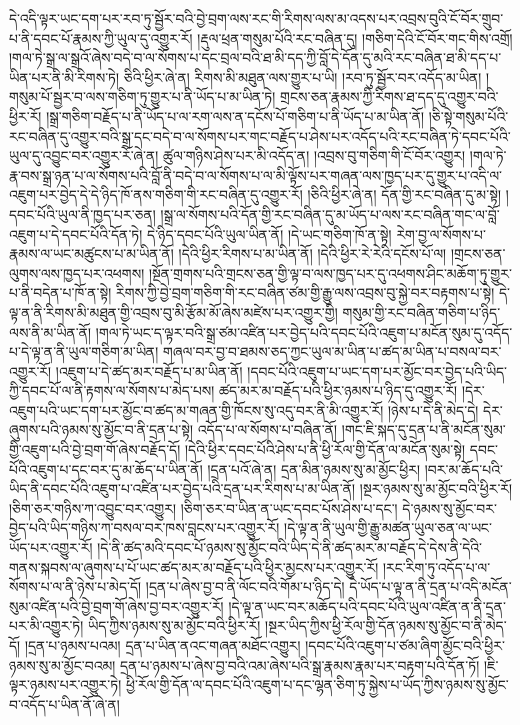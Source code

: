 དེ་འདི་ལྟར་ཡང་དག་པར་རབ་ཏུ་སྦྱོར་བའི་བྱེ་བྲག་ལས་རང་གི་རིགས་ལས་མ་འདས་པར་འབྲས་བུའི་ངོ་བོར་གྲུབ་པ་ནི་དབང་པོ་རྣམས་ཀྱི་ཡུལ་དུ་འགྱུར་རོ། །རྡུལ་ཕྲན་གསུམ་པོའི་རང་བཞིན་དུ། །གཅིག་དེའི་ངོ་བོར་གང་གིས་འགྲོ། །གལ་ཏེ་སྒྲ་ལ་སྒྲའོ་ཞེས་བདེ་བ་ལ་སོགས་པ་དང་བྲལ་བའི་ཐ་མི་དད་ཀྱི་བློ་དེ་དོན་དུ་མའི་རང་བཞིན་ཐ་མི་དད་པ་ཡིན་པར་ནི་མི་རིགས་ཏེ། ཅིའི་ཕྱིར་ཞེ་ན། རིགས་མི་མཐུན་ལས་གྱུར་པ་ཡི། །རབ་ཏུ་སྦྱོར་བར་འདོད་མ་ཡིན། །གསུམ་པོ་སྦྱར་བ་ལས་གཅིག་ཏུ་གྱུར་པ་ནི་ཡོད་པ་མ་ཡིན་ཏེ། གྲངས་ཅན་རྣམས་ཀྱི་རིགས་ཐ་དད་དུ་འགྱུར་བའི་ཕྱིར་རོ། །སྒྲ་གཅིག་བརྗོད་པ་ནི་ཡོད་པ་ལ་རག་ལས་ན་དངོས་པོ་གཅིག་པ་ནི་ཡོད་པ་མ་ཡིན་ནོ། །ཅི་སྟེ་གསུམ་པོའི་རང་བཞིན་དུ་འགྱུར་བའི་སྒྲ་དང་བདེ་བ་ལ་སོགས་པར་གང་བརྗོད་པ་ཤེས་པར་འདོད་པའི་རང་བཞིན་ཏེ་དབང་པོའི་ཡུལ་དུ་འབྱུང་བར་འགྱུར་རོ་ཞེ་ན། ཚུལ་གཉིས་ཤེས་པར་མི་འདོད་ན། །འབྲས་བུ་གཅིག་གི་ངོ་བོར་འགྱུར། །གལ་ཏེ་རྣ་བས་སྒྲ་ཉན་པ་ལ་སོགས་པའི་བློ་ནི་བདེ་བ་ལ་སོགས་པ་ལ་མི་ལྟོས་པར་གཞན་ལས་ཁྱད་པར་དུ་གྱུར་པ་འདི་ལ་འཇུག་པར་བྱེད་དེ་དེ་ཉིད་ཁོ་ནས་གཅིག་གི་རང་བཞིན་དུ་འགྱུར་རོ། །ཅིའི་ཕྱིར་ཞེ་ན། དོན་གྱི་རང་བཞིན་དུ་མ་སྟེ། །དབང་པོའི་ཡུལ་ནི་ཁྱད་པར་ཅན། །སྒྲ་ལ་སོགས་པའི་དོན་གྱི་རང་བཞིན་དུ་མ་ཡོད་པ་ལས་རང་བཞིན་གང་ལ་བློ་འཇུག་པ་དེ་དབང་པོའི་དོན་ཏེ། དེ་ཉིད་དབང་པོའི་ཡུལ་ཡིན་ནོ། །དེ་ཡང་གཅིག་ཁོ་ན་སྟེ། རེག་བྱ་ལ་སོགས་པ་རྣམས་ལ་ཡང་མཚུངས་པ་མ་ཡིན་ནོ། །དེའི་ཕྱིར་རིགས་པ་མ་ཡིན་ནོ། །དེའི་ཕྱིར་རེ་རེའི་དངོས་པོ་ལ། །གྲངས་ཅན་ལུགས་ལས་ཁྱད་པར་འཕགས། །སྔོན་གྲགས་པའི་གྲངས་ཅན་གྱི་ལྟ་བ་ལས་ཁྱད་པར་དུ་འཕགས་ཤིང་མཆོག་ཏུ་གྱུར་པ་ནི་བདེན་པ་ཁོ་ན་སྟེ། རིགས་ཀྱི་བྱེ་བྲག་གཅིག་གི་རང་བཞིན་ཙམ་གྱི་རྒྱུ་ལས་འབྲས་བུ་སྐྱེ་བར་བརྟགས་པ་སྟེ། དེ་ལྟ་ན་ནི་རིགས་མི་མཐུན་གྱི་འབྲས་བུ་མི་རྩོམ་མོ་ཞེས་མཛེས་པར་འགྱུར་གྱི། གསུམ་གྱི་རང་བཞིན་གཅིག་པ་ཉིད་ལས་ནི་མ་ཡིན་ནོ། །གལ་ཏེ་ཡང་ད་ལྟར་བའི་སྒྲ་ཙམ་འཛིན་པར་བྱེད་པའི་དབང་པོའི་འཇུག་པ་མངོན་སུམ་དུ་འདོད་པ་དེ་ལྟ་ན་ནི་ཡུལ་གཅིག་མ་ཡིན། གཞལ་བར་བྱ་བ་ཐམས་ཅད་ཀྱང་ཡུལ་མ་ཡིན་པ་ཚད་མ་ཡིན་པ་བསལ་བར་འགྱུར་རོ། །འཇུག་པ་དེ་ཚད་མར་བརྗོད་པ་མ་ཡིན་ནོ། །དབང་པོའི་འཇུག་པ་ཡང་དག་པར་མྱོང་བར་བྱེད་པའི་ཡིད་ཀྱི་དབང་པོ་ལ་ནི་རྟགས་ལ་སོགས་པ་མེད་པས། ཚད་མར་མ་བརྗོད་པའི་ཕྱིར་ཉམས་པ་ཉིད་དུ་འགྱུར་རོ། །དེར་འཇུག་པའི་ཡང་དག་པར་མྱོང་བ་ཚད་མ་གཞན་གྱི་ཁོངས་སུ་འདུ་བར་ནི་མི་འགྱུར་རོ། །ཉེས་པ་དེ་ནི་མེད་དེ། དེར་ཞུགས་པའི་ཉམས་སུ་མྱོང་བ་ནི་དྲན་པ་སྟེ། འདོད་པ་ལ་སོགས་པ་བཞིན་ནོ། །གང་ཇི་སྐད་དུ་དྲན་པ་ནི་མངོན་སུམ་གྱི་འཇུག་པའི་བྱེ་བྲག་གོ་ཞེས་བརྗོད་དོ། །དེའི་ཕྱིར་དབང་པོའི་ཤེས་པ་ནི་ཕྱི་རོལ་གྱི་དོན་ལ་མངོན་སུམ་སྟེ། དབང་པོའི་འཇུག་པ་དང་བར་དུ་མ་ཆོད་པ་ཡིན་ནོ། །དྲན་པའོ་ཞེ་ན། དྲན་མིན་ཉམས་སུ་མ་མྱོང་ཕྱིར། །བར་མ་ཆོད་པའི་ཡིད་ནི་དབང་པོའི་འཇུག་པ་འཛིན་པར་བྱེད་པའི་དྲན་པར་རིགས་པ་མ་ཡིན་ནོ། །སྔར་ཉམས་སུ་མ་མྱོང་བའི་ཕྱིར་རོ། །ཅིག་ཅར་གཉིས་ཀ་འབྱུང་བར་འགྱུར། །ཅིག་ཅར་བ་ཡིན་ན་ཡང་དབང་པོས་ཤེས་པ་དང་། དེ་ཉམས་སུ་མྱོང་བར་བྱེད་པའི་ཡིད་གཉིས་ཀ་བསལ་བར་ཁས་བླངས་པར་འགྱུར་རོ། །དེ་ལྟ་ན་ནི་ཡུལ་གྱི་རྒྱུ་མཚན་ཡུལ་ཅན་ལ་ཡང་ཡོད་པར་འགྱུར་རོ། །དེ་ནི་ཚད་མའི་དབང་པོ་ཉམས་སུ་མྱོང་བའི་ཡིད་དེ་ནི་ཚད་མར་མ་བརྗོད་དེ་དེས་ནི་དེའི་གནས་སྐབས་ལ་ཞུགས་པ་པོ་ཡང་ཚད་མར་མ་བརྗོད་པའི་ཕྱིར་མྱངས་པར་འགྱུར་རོ། །རང་རིག་ཏུ་འདོད་པ་ལ་སོགས་པ་ལ་ནི་ཉེས་པ་མེད་དོ། །དྲན་པ་ཞེས་བྱ་བ་ནི་ལོང་བའི་གོམ་པ་ཉིད་དེ། དེ་ཡོད་པ་ལྟ་ན་ནི་དྲན་པ་འདི་མངོན་སུམ་འཛིན་པའི་བྱེ་བྲག་གོ་ཞེས་བྱ་བར་འགྱུར་རོ། །དེ་ལྟ་ན་ཡང་བར་མཆོད་པའི་དབང་པོའི་ཡུལ་འཛིན་ན་ནི་དྲན་པར་མི་འགྱུར་ཏེ། ཡིད་ཀྱིས་ཉམས་སུ་མ་མྱོང་བའི་ཕྱིར་རོ། །སྔར་ཡིད་ཀྱིས་ཕྱི་རོལ་གྱི་དོན་ཉམས་སུ་མྱོང་བ་ནི་མེད་དོ། །དྲན་པ་ཉམས་པའམ། དྲན་པ་ཡིན་ནའང་གཞན་མཐོང་འགྱུར། །དབང་པོའི་འཇུག་པ་ཙམ་ཞིག་མྱོང་བའི་ཕྱིར་ཉམས་སུ་མ་མྱོང་བའམ། དྲན་པ་ཉམས་པ་ཞེས་བྱ་བའི་འམ་ཞེས་པའི་སྒྲ་རྣམས་རྣམ་པར་བརྟག་པའི་དོན་ཏོ། །ཇི་ལྟར་ཉམས་པར་འགྱུར་ཏེ། ཕྱི་རོལ་གྱི་དོན་ལ་དབང་པོའི་འཇུག་པ་དང་ལྷན་ཅིག་ཏུ་སྐྱེས་པ་ཡོད་ཀྱིས་ཉམས་སུ་མྱོང་བ་འདོད་པ་ཡིན་ནོ་ཞེ་ན། 